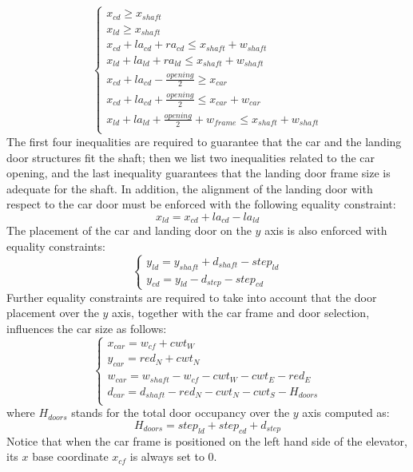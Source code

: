 \begin{equation}
\begin{cases}
x_{cd} \geq x_{shaft} \\
x_{ld} \geq x_{shaft} \\ 
x_{cd} + la_{cd} + ra_{cd} \leq x_{shaft} +
w_{shaft}\\
x_{ld} + la_{ld} + ra_{ld} \leq x_{shaft} + w_{shaft}\\
x_{cd} + la_{cd} - \frac{opening}{2} \geq x_{car}\\
x_{cd} + la_{cd} + \frac{opening}{2} \leq x_{car} + w_{car}\\
x_{ld} + la_{ld} + \frac{opening}{2} + w_{frame} \leq
x_{shaft} + w_{shaft}\\
\end{cases}
\label{eq:DoorConstr}
\end{equation}
The first four inequalities are required to guarantee that
the car and the landing door structures fit the shaft; then
we list two inequalities related to the car opening, and the last inequality
guarantees that the landing door frame size is adequate for the shaft.
In addition, the alignment of the landing door with respect to the car
door must be enforced with the following equality constraint:
\begin{equation}
x_{ld} = x_{cd} + la_{cd} - la_{ld}
\end{equation}
The placement of the car and landing door on the $y$ axis is also enforced
with equality constraints:
\begin{equation}
\label{eq:Doory}
\begin{cases}
y_{ld} = y_{shaft} + d_{shaft} - step_{ld}\\
y_{cd} = y_{ld} - d_{step} - step_{cd}
\end{cases}
\end{equation}
Further equality constraints are required to take into account
that the door placement over the $y$ axis, together with the car frame
and door selection, influences the car size as follows: 
\begin{equation}
\begin{cases}
x_{car} = w_{cf} + cwt_{W}\\ 
y_{car} = red_{N} + cwt_{N}\\ 
w_{car} = w_{shaft} - w_{cf} - cwt_{W} - cwt_{E} - red_{E}\\ 
d_{car} = d_{shaft} - red_{N} - cwt_{N} - cwt_{S} - H_{doors}\\
\end{cases}
\label{eq:CarConstr}
\end{equation}
where $H_{doors}$ stands for the total door occupancy over the $y$
axis computed as:
\begin{equation}
H_{doors} = step_{ld} + step_{cd} + d_{step}
\label{eqnDoorsH}
\end{equation}
Notice that when the car frame is positioned on the left hand side of the
elevator, its $x$ base coordinate $x_{cf}$ is always set to $0$.

